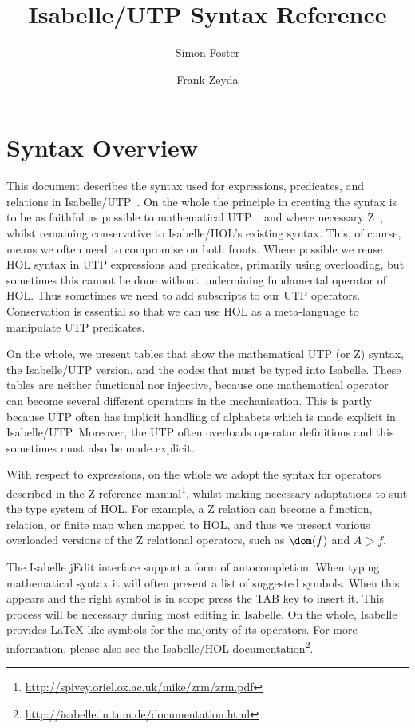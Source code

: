 \documentclass[11pt]{article}
\title{Isabelle/UTP Syntax Reference}
\author{Simon Foster \and Frank Zeyda}
\begin{document}
\maketitle

\vspace{-8ex}

\tableofcontents

\section{Syntax Overview}

This document describes the syntax used for expressions, predicates, and relations in Isabelle/UTP~\cite{Foster16a}. On
the whole the principle in creating the syntax is to be as faithful as possible to mathematical
UTP~\cite{Hoare&98,Cavalcanti&06}, and where necessary Z~\cite{Z}, whilst remaining conservative to Isabelle/HOL's
existing syntax. This, of course, means we often need to compromise on both fronts. Where possible we reuse HOL syntax
in UTP expressions and predicates, primarily using overloading, but sometimes this cannot be done without undermining
fundamental operator of HOL. Thus sometimes we need to add subscripts to our UTP operators. Conservation is essential so
that we can use HOL as a meta-language to manipulate UTP predicates.

On the whole, we present tables that show the mathematical UTP (or Z) syntax, the Isabelle/UTP version, and the codes
that must be typed into Isabelle. These tables are neither functional nor injective, because one mathematical operator
can become several different operators in the mechanisation. This is partly because UTP often has implicit handling of
alphabets which is made explicit in Isabelle/UTP. Moreover, the UTP often overloads operator definitions and this
sometimes must also be made explicit.

With respect to expressions, on the whole we adopt the syntax for operators described in the Z reference
manual\footnote{\url{http://spivey.oriel.ox.ac.uk/mike/zrm/zrm.pdf}}, whilst making necessary adaptations to suit the
type system of HOL. For example, a Z relation can become a function, relation, or finite map when mapped to HOL, and
thus we present various overloaded versions of the Z relational operators, such as $\dom(f)$ and $A \rres f$.

The Isabelle jEdit interface support a form of autocompletion. When typing mathematical syntax it will often present a
list of suggested symbols. When this appears and the right symbol is in scope press the TAB key to insert it. This
process will be necessary during most editing in Isabelle. On the whole, Isabelle provides \LaTeX-like symbols for the
majority of its operators. For more information, please also see the Isabelle/HOL
documentation\footnote{\url{http://isabelle.in.tum.de/documentation.html}}.
\end{document}
